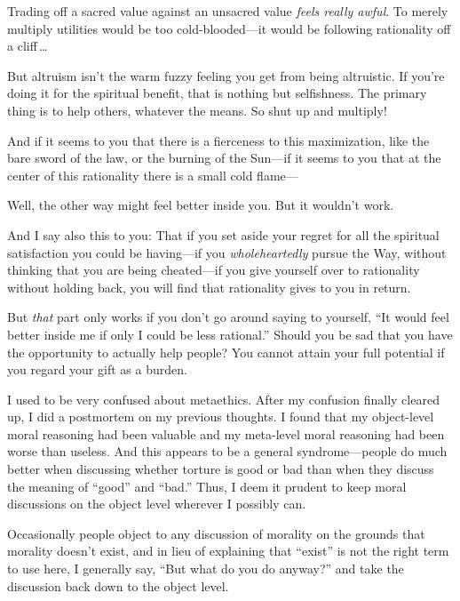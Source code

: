  Trading off a sacred value against an unsacred value \textit{feels
really awful}. To merely multiply utilities would be too
cold-blooded---it would be following rationality off a cliff\,\ldots


 But altruism isn't the warm fuzzy feeling you get
from being altruistic. If you're doing it for the
spiritual benefit, that is nothing but selfishness. The primary thing
is to help others, whatever the means. So shut up and multiply!


 And if it seems to you that there is a fierceness to this
maximization, like the bare sword of the law, or the burning of the
Sun---if it seems to you that at the center of this rationality there
is a small cold flame---


 Well, the other way might feel better inside you. But it
wouldn't work.


 And I say also this to you: That if you set aside your regret for
all the spiritual satisfaction you could be having---if you
\textit{wholeheartedly} pursue the Way, without thinking that you are
being cheated---if you give yourself over to rationality without
holding back, you will find that rationality gives to you in return.


 But \textit{that} part only works if you don't go
around saying to yourself, ``It would feel better
inside me if only I could be less rational.'' Should
you be sad that you have the opportunity to actually help people? You
cannot attain your full potential if you regard your gift as a burden.

\myendsectiontext



 I used to be very confused about metaethics. After my confusion
finally cleared up, I did a postmortem on my previous thoughts. I found
that my object-level moral reasoning had been valuable and my
meta-level moral reasoning had been worse than useless. And this
appears to be a general syndrome---people do much better when
discussing whether torture is good or bad than when they discuss the
meaning of ``good'' and
``bad.'' Thus, I deem it prudent to
keep moral discussions on the object level wherever I possibly can.


 Occasionally people object to any discussion of morality on the
grounds that morality doesn't exist, and in lieu of
explaining that ``exist'' is not the
right term to use here, I generally say, ``But what do
you do anyway?'' and take the discussion back down to
the object level.


